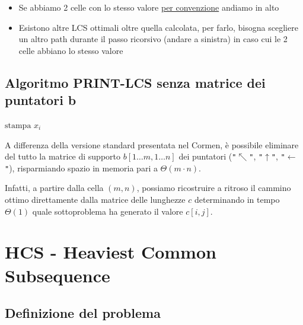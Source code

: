 \begin{itemize}
    \item {\color{blue}Se abbiamo 2 celle con lo stesso valore \uline{per convenzione} andiamo in alto}
    \item Esistono altre LCS ottimali oltre quella calcolata, per farlo, bisogna scegliere un altro path durante il passo ricorsivo (andare a sinistra) in caso cui le 2 celle abbiano lo stesso valore
\end{itemize}

\subsection{Algoritmo PRINT-LCS senza matrice dei puntatori b}
\begin{algorithm}[H]
\caption{PRINT-LCS senza matrice dei puntatori}
\begin{algorithmic}[1]
     
        \State \Return
    \EndIf
     
        \State {}
        \State $\text{stampa } x_i$
    \Else
            \State {} 
        \Else
            \State {} 
        \EndIf
    \EndIf
\EndProcedure
\end{algorithmic}
\end{algorithm}

\noindent
A differenza della versione standard presentata nel Cormen, è possibile eliminare del tutto la matrice di supporto $b[1\dots m, 1\dots n]$ dei puntatori (\texttt{"$\nwarrow$"}, \texttt{"$\uparrow$"}, \texttt{"$\leftarrow$"}), risparmiando spazio in memoria pari a $\Theta(m \cdot n)$. 

Infatti, a partire dalla cella $(m, n)$, possiamo ricostruire a ritroso il cammino ottimo direttamente dalla matrice delle lunghezze $c$ determinando in tempo $\Theta(1)$ quale sottoproblema ha generato il valore $c[i,j]$.

\newpage
\section{HCS - Heaviest Common Subsequence}
\subsection{Definizione del problema}

